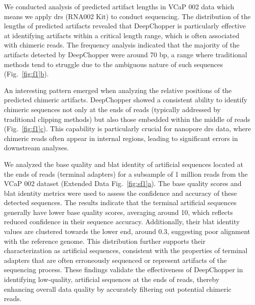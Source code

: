 \documentclass[pdflatex, sn-mathphys-num, lineno]{sn-jnl}%
\newcommand{\figref}[2]{Fig.~\hyperref[#1]{\ref*{#1}#2}}
\newcommand{\edfigref}[2]{Extended Data Fig.~\hyperref[#1]{\ref*{#1}#2}}
\theoremstyle{thmstyleone}%
\theoremstyle{thmstyletwo}%
\theoremstyle{thmstylethree}%
\begin{document}
We conducted analysis of predicted artifact lengths in VCaP 002 data which means we apply \gls{drs} (RNA002 Kit) to conduct sequencing.
The distribution of the lengths of predicted artifacts revealed that DeepChopper is particularly effective at identifying artifacts within a critical length range, which is often associated with chimeric reads.
The frequency analysis indicated that the majority of the artifacts detected by DeepChopper were around 70 bp, a range where traditional methods tend to struggle due to the ambiguous nature of such sequences (\figref{fig:f1}{b}).

An interesting pattern emerged when analyzing the relative positions of the predicted chimeric artifacts.
DeepChopper showed a consistent ability to identify chimeric sequences not only at the ends of reads (typically addressed by traditional clipping methods) but also those embedded within the middle of reads (\figref{fig:f1}{c}).
This capability is particularly crucial for nanopore \gls{drs} data, where chimeric reads often appear in internal regions, leading to significant errors in downstream analyses.

We analyzed the base quality and \gls{blat} identity of artificial sequences located at the ends of reads (terminal adapters) for a subsample of 1 million reads from the VCaP 002 dataset (\edfigref{fig:sf1}{a}).
The base quality scores and \gls{blat} identity metrics were used to assess the confidence and accuracy of these detected sequences.
The results indicate that the terminal artificial sequences generally have lower base quality scores, averaging around 10, which reflects reduced confidence in their sequence accuracy.
Additionally, their \gls{blat} identity values are clustered towards the lower end, around 0.3, suggesting poor alignment with the reference genome.
This distribution further supports their characterization as artificial sequences, consistent with the properties of terminal adapters that are often erroneously sequenced or represent artifacts of the sequencing process.
These findings validate the effectiveness of DeepChopper in identifying low-quality, artificial sequences at the ends of reads, thereby enhancing overall data quality by accurately filtering out potential chimeric reads.
\end{document}
